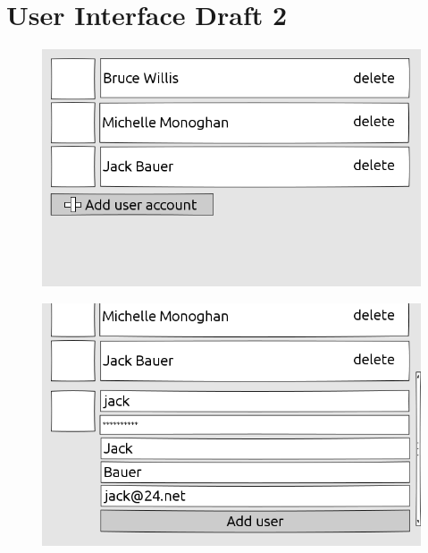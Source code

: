 \chapter{User Interface Draft 2}
\begin{landscape}
	\begin{figure}[H]
		\centering
		\includegraphics[width=1.4\textwidth]{../ui/img/uiDraft2/User view - select user.png}
		\label{login screen}
	\end{figure}
	\begin{figure}[H]
		\centering
		\includegraphics[width=1.4\textwidth]{../ui/img/uiDraft2/User view - add user.png}
		\label{user management screen}
	\end{figure}
		\begin{figure}[H]
		\centering

\end{figure}
\end{landscape}
